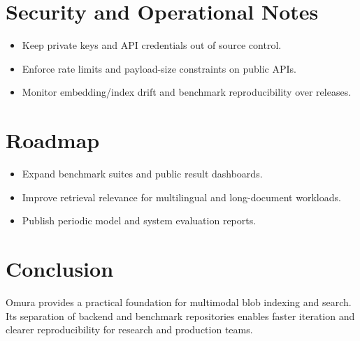 \documentclass[11pt]{article}
\begin{document}
\section{Security and Operational Notes}
\begin{itemize}[leftmargin=1.2em]
  \item Keep private keys and API credentials out of source control.
  \item Enforce rate limits and payload-size constraints on public APIs.
  \item Monitor embedding/index drift and benchmark reproducibility over releases.
\end{itemize}

\section{Roadmap}
\begin{itemize}[leftmargin=1.2em]
  \item Expand benchmark suites and public result dashboards.
  \item Improve retrieval relevance for multilingual and long-document workloads.
  \item Publish periodic model and system evaluation reports.
\end{itemize}

\section{Conclusion}
Omura provides a practical foundation for multimodal blob indexing and search.
Its separation of backend and benchmark repositories enables faster iteration
and clearer reproducibility for research and production teams.
\end{document}
